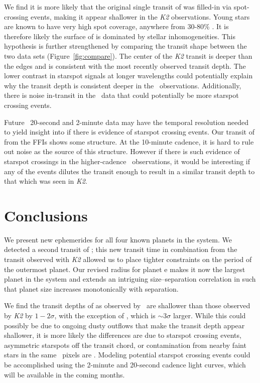 \documentclass[linenumbers,modern,twocolumn]{aastex631}
\begin{document}
We find it is more likely that the original single transit of \planete was filled-in via spot-crossing events, making it appear shallower in the \textit{K2} observations. Young stars are known to have very high spot coverage, anywhere from 30-80\% \citep[][]{grankin99, gully17, feinstein20}. It is therefore likely the surface of \sname is dominated by stellar inhomogeneities. This hypothesis is further strengthened by comparing the transit shape between the two data sets (Figure~\ref{fig:compare}). The center of the \textit{K2} transit is deeper than the edges and is consistent with the most recently observed transit depth. The lower contrast in starspot signals at longer wavelengths could potentially explain why the transit depth is consistent deeper in the \tess\ observations. Additionally, there is noise in-transit in the \tess\ data that could potentially be more starspot crossing events.


Future \tess\ 20-second and 2-minute data may have the temporal resolution needed to yield insight into if there is evidence of starspot crossing events. Our transit of \planete from the FFIs shows some structure. At the 10-minute cadence, it is hard to rule out noise as the source of this structure. However if there is such evidence of starspot crossings in the higher-cadence \tess\ observations, it would be interesting if any of the events dilutes the transit enough to result in a similar transit depth to that which was seen in \textit{K2}. 

\section{Conclusions} \label{sec:conclusions}

We present new ephemerides for all four known planets in the \sname system. We detected a second transit of \planete; this new transit time in combination from the transit observed with \textit{K2} allowed us to place tighter constraints on the period of the outermost planet. Our revised radius for planet e makes it now the largest planet in the system and extends an intriguing size--separation correlation in \sname such that planet size increases monotonically with separation.

We find the transit depths of \planetknown as observed by \tess\ are shallower than those observed by \textit{K2} by $1-2\sigma$, with the exception of \planete, which is $\sim 3\sigma$ larger. While this could possibly be due to ongoing dusty outflows that make the transit depth appear shallower, it is more likely the differences are due to starspot crossing events, asymmetric starspots off the transit chord, or contamination from nearby faint stars in the same \tess\ pixels are \sname. Modeling potential starspot crossing events could be accomplished using the 2-minute and 20-second cadence light curves, which will be available in the coming months.
\end{document}
